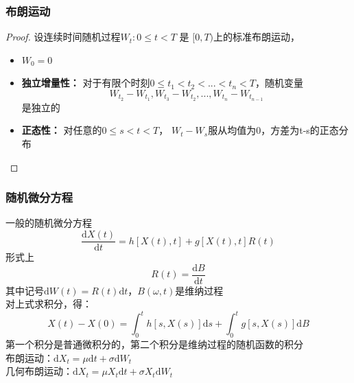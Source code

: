 \documentclass{beamer}
\begin{document}
\begin{frame}

\frametitle{布朗运动}	

\begin{proof}

设连续时间随机过程$W_t: 0 \leq t < T$ 是 $[0,T)$上的标准布朗运动，

\begin{itemize}

\item $W_0 = 0$

\item \textbf{独立增量性：} 对于有限个时刻$0 \leq t_1 < t_2 < ... < t_n < T$，随机变量$$W_{t_2}-W_{t_1},W_{t_3}-W_{t_2},...,W_{t_n}-W_{t_{n-1}}$$是独立的

\item \textbf{正态性：} 对任意的$0 \leq s < t < T$， $W_t-W_s$服从均值为0，方差为t-s的正态分布

\end{itemize}

\end{proof}

\end{frame}

\begin{frame}

\frametitle{随机微分方程}

一般的随机微分方程$$\frac{\mathrm{d}X(t)}{\mathrm{d}t}=h[X(t),t]+g[X(t),t]R(t)$$
形式上$$R(t)=\frac{\mathrm{d}B}{\mathrm{d}t}$$
其中记号$\mathrm{d}W(t)=R(t)\mathrm{d}t$，$B(\omega,t)$是维纳过程 \\
对上式求积分，得：$$X(t)-X(0)=\int_0^t h[s,X(s)]\mathrm{d}s + \int_0^t g[s,X(s)]\mathrm{d}B$$
第一个积分是普通微积分的，第二个积分是维纳过程的随机函数的积分\\
布朗运动：$\mathrm{d}X_t = \mu \mathrm{d}t + \sigma\mathrm{d}W_t$\\
几何布朗运动：$\mathrm{d}X_t = \mu X_t\mathrm{d}t + \sigma X_t\mathrm{d}W_t$

\end{frame}
\end{document}
